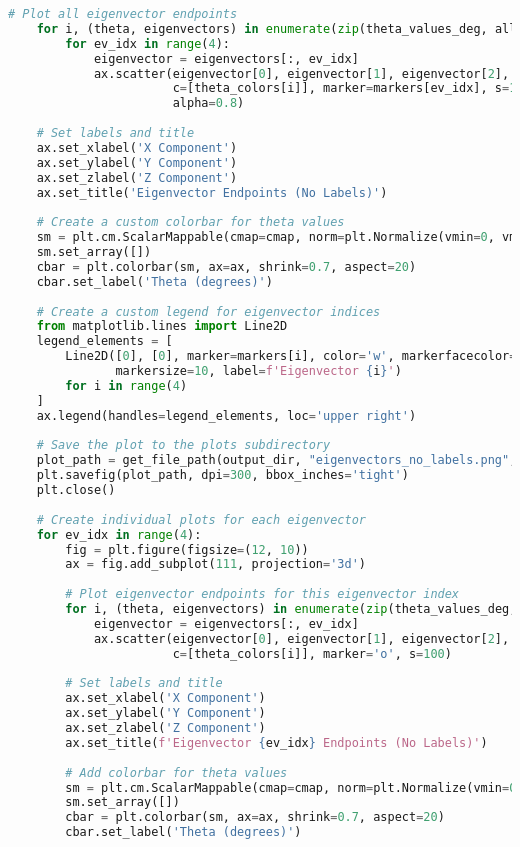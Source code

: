 \begin{lstlisting}[language=Python]
    # Plot all eigenvector endpoints
    for i, (theta, eigenvectors) in enumerate(zip(theta_values_deg, all_eigenvectors)):
        for ev_idx in range(4):
            eigenvector = eigenvectors[:, ev_idx]
            ax.scatter(eigenvector[0], eigenvector[1], eigenvector[2], 
                       c=[theta_colors[i]], marker=markers[ev_idx], s=100, 
                       alpha=0.8)
    
    # Set labels and title
    ax.set_xlabel('X Component')
    ax.set_ylabel('Y Component')
    ax.set_zlabel('Z Component')
    ax.set_title('Eigenvector Endpoints (No Labels)')
    
    # Create a custom colorbar for theta values
    sm = plt.cm.ScalarMappable(cmap=cmap, norm=plt.Normalize(vmin=0, vmax=360))
    sm.set_array([])
    cbar = plt.colorbar(sm, ax=ax, shrink=0.7, aspect=20)
    cbar.set_label('Theta (degrees)')
    
    # Create a custom legend for eigenvector indices
    from matplotlib.lines import Line2D
    legend_elements = [
        Line2D([0], [0], marker=markers[i], color='w', markerfacecolor='gray', 
               markersize=10, label=f'Eigenvector {i}')
        for i in range(4)
    ]
    ax.legend(handles=legend_elements, loc='upper right')
    
    # Save the plot to the plots subdirectory
    plot_path = get_file_path(output_dir, "eigenvectors_no_labels.png", "png")
    plt.savefig(plot_path, dpi=300, bbox_inches='tight')
    plt.close()
    
    # Create individual plots for each eigenvector
    for ev_idx in range(4):
        fig = plt.figure(figsize=(12, 10))
        ax = fig.add_subplot(111, projection='3d')
        
        # Plot eigenvector endpoints for this eigenvector index
        for i, (theta, eigenvectors) in enumerate(zip(theta_values_deg, all_eigenvectors)):
            eigenvector = eigenvectors[:, ev_idx]
            ax.scatter(eigenvector[0], eigenvector[1], eigenvector[2], 
                       c=[theta_colors[i]], marker='o', s=100)
        
        # Set labels and title
        ax.set_xlabel('X Component')
        ax.set_ylabel('Y Component')
        ax.set_zlabel('Z Component')
        ax.set_title(f'Eigenvector {ev_idx} Endpoints (No Labels)')
        
        # Add colorbar for theta values
        sm = plt.cm.ScalarMappable(cmap=cmap, norm=plt.Normalize(vmin=0, vmax=360))
        sm.set_array([])
        cbar = plt.colorbar(sm, ax=ax, shrink=0.7, aspect=20)
        cbar.set_label('Theta (degrees)')
        

\end{lstlisting}
